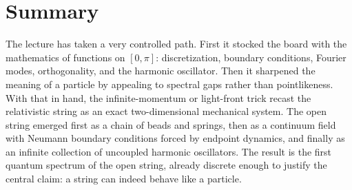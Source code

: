 \section{Summary}

The lecture has taken a very controlled path. First it stocked the board with the mathematics of functions on \([0,\pi]\): discretization, boundary conditions, Fourier modes, orthogonality, and the harmonic oscillator. Then it sharpened the meaning of a particle by appealing to spectral gaps rather than pointlikeness. With that in hand, the infinite-momentum or light-front trick recast the relativistic string as an exact two-dimensional mechanical system. The open string emerged first as a chain of beads and springs, then as a continuum field with Neumann boundary conditions forced by endpoint dynamics, and finally as an infinite collection of uncoupled harmonic oscillators. The result is the first quantum spectrum of the open string, already discrete enough to justify the central claim: a string can indeed behave like a particle.